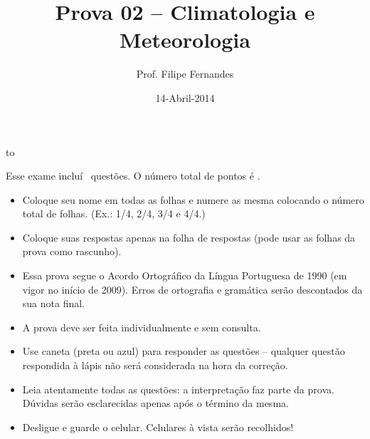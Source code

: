 \documentclass[letterpaper,portuguese,12pt,pdftex]{exam}
\title{Prova 02 -- Climatologia e Meteorologia}
\author{Prof. Filipe Fernandes}
\date{14-Abril-2014}
\begin{document}
\maketitle
\doublespacing

\hbox to \textwidth{Nome e número de matrícula:\enspace\hrulefill}
\vspace{0.5cm}

\begin{minipage}{.8\textwidth} %
Esse exame incluí \numquestions\ questões. O número total de pontos é \numpoints.
\vspace{1cm}
{\small
\begin{itemize}
  \item Coloque seu nome em todas as folhas e numere as mesma colocando o
        número total de folhas. (Ex.: 1/4, 2/4, 3/4 e 4/4.)
  \item Coloque suas respostas apenas na folha de respostas (pode usar
        as folhas da prova como rascunho).
  \item Essa prova segue o Acordo Ortográfico da Língua Portuguesa de 1990 (em
        vigor no início de 2009).  Erros de ortografia e gramática
        serão descontados da sua nota final.
  \item A prova deve ser feita individualmente e sem consulta.
  \item Use caneta (preta ou azul) para responder as questões – qualquer questão
        respondida à lápis não será considerada na hora da correção.
  \item Leia atentamente todas as questões: a interpretação faz parte da prova.
        Dúvidas serão esclarecidas apenas após o término da mesma.
  \item Desligue e guarde o celular.  Celulares à vista serão recolhidos!
\end{itemize}
}
\end{minipage}

\newpage
\end{document}
